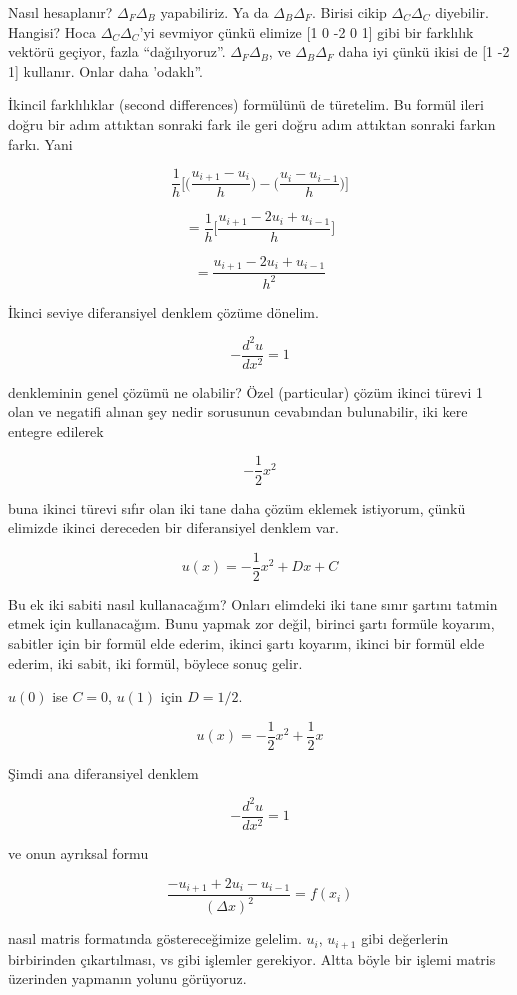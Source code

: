 \documentclass[12pt,fleqn]{article}\usepackage{../../common}
\begin{document}
Nasıl hesaplanır? $\Delta_F \Delta_B$ yapabiliriz. Ya da $\Delta_B
\Delta_F$. Birisi cikip $\Delta_C \Delta_C$ diyebilir. Hangisi? Hoca
$\Delta_C \Delta_C$'yi sevmiyor çünkü elimize [1 0 -2 0 1] gibi bir
farklılık vektörü geçiyor, fazla ``dağılıyoruz''.  $\Delta_F \Delta_B$, ve
$\Delta_B \Delta_F$ daha iyi çünkü ikisi de [1 -2 1] kullanır. Onlar daha
'odaklı''.

İkincil farklılıklar (second differences) formülünü de türetelim. Bu formül
ileri doğru bir adım attıktan sonraki fark ile geri doğru adım attıktan
sonraki farkın farkı. Yani

$$ \frac{1}{h} 
\bigg[
\bigg(\frac{u_{i+1}-u_{i}}{h}\bigg) -
\bigg(\frac{u_{i}-u_{i-1}}{h}\bigg) 
\bigg]
 $$

$$ = \frac{1}{h} 
\bigg[
\frac{u_{i+1} - 2u_{i}+u_{i-1}}{h}
\bigg]
 $$

$$ = \frac{u_{i+1} - 2u_{i}+u_{i-1}}{h^2} $$

İkinci seviye diferansiyel denklem çözüme dönelim. 

$$ -\frac{d^2u}{dx^2} = 1 $$

denkleminin genel çözümü ne olabilir? Özel (particular) çözüm ikinci
türevi 1 olan ve negatifi alınan şey nedir sorusunun cevabından
bulunabilir, iki kere entegre edilerek

$$ -\frac{1}{2}x^2 $$

buna ikinci türevi sıfır olan iki tane daha çözüm eklemek istiyorum, çünkü
elimizde ikinci dereceden bir diferansiyel denklem var.

$$ u(x) = -\frac{1}{2}x^2 + Dx + C$$

Bu ek iki sabiti nasıl kullanacağım? Onları elimdeki iki tane sınır şartını
tatmin etmek için kullanacağım. Bunu yapmak zor değil, birinci şartı
formüle koyarım, sabitler için bir formül elde ederim, ikinci şartı
koyarım, ikinci bir formül elde ederim, iki sabit, iki formül, böylece
sonuç gelir. 

$u(0)$ ise $C = 0$, $u(1)$ için $D=1/2$. 

$$ u(x) = -\frac{1}{2}x^2  + \frac{1}{2} x$$

Şimdi ana diferansiyel denklem

$$ -\frac{d^2u}{dx^2} = 1 $$

ve onun ayrıksal formu

$$ \frac{-u_{i+1}+2u_i - u_{i-1}}{(\Delta x)^2} = f(x_i)$$

nasıl matris formatında göstereceğimize gelelim. $u_i$, $u_{i+1}$ gibi
değerlerin birbirinden çıkartılması, vs gibi işlemler gerekiyor. Altta
böyle bir işlemi matris üzerinden yapmanın yolunu görüyoruz.
\end{document}
